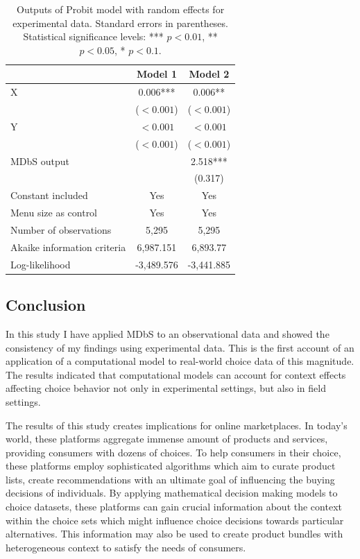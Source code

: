 \documentclass[a4paper,12pt]{article}
\begin{document}
\begin{table}
    \centering
    \renewcommand{\arraystretch}{1.5}
    \begin{tabular}{lcc}
    \hline
     & Model 1 & Model 2 \\
    \hline
    X & 0.006*** & 0.006** \\
     & ($<0.001$) & ($<0.001$) \\[1ex]
    Y & $<0.001$ & $<0.001$ \\
     & ($<0.001$) & ($<0.001$) \\[1ex]
    MDbS output & & 2.518*** \\
     & & (0.317) \\[1ex]
    Constant included & Yes & Yes \\[1ex]
    Menu size as control & Yes & Yes \\[1ex]
    Number of observations & 5,295 & 5,295 \\[1ex]
    Akaike information criteria & 6,987.151 & 6,893.77 \\[1ex]
    Log-likelihood & -3,489.576 & -3,441.885 \\
    \hline
    \end{tabular}
    \caption{Outputs of Probit model with random effects for experimental data. Standard errors in parentheses. Statistical significance levels: *** $p<0.01$, ** $p<0.05$, * $p<0.1.$}
    \label{tab:noguchiProbitResults}
\end{table}

\subsection{Conclusion}

In this study I have applied MDbS to an observational data and showed the consistency of my findings using experimental data. This is the first account of an application of a computational model to real-world choice data of this magnitude. The results indicated that computational models can account for context effects affecting choice behavior not only in experimental settings, but also in field settings.

The results of this study creates implications for online marketplaces. In today's world, these platforms aggregate immense amount of products and services, providing consumers with dozens of choices. To help consumers in their choice, these platforms employ sophisticated algorithms which aim to curate product lists, create recommendations with an ultimate goal of influencing the buying decisions of individuals. By applying mathematical decision making models to choice datasets, these platforms can gain crucial information about the context within the choice sets which might influence choice decisions towards particular alternatives. This information may also be used to create product bundles with heterogeneous context to satisfy the needs of consumers.
\end{document}
